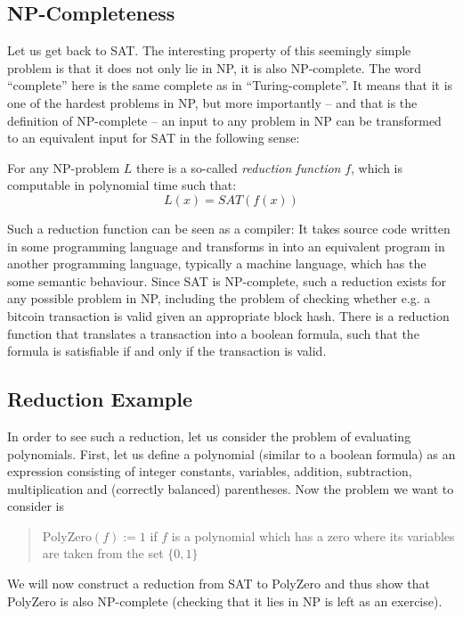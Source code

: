 \documentclass[11pt,letterpaper]{article}
\begin{document}
\subsection{NP-Completeness}

Let us get back to SAT. The interesting property of this seemingly simple problem is that it does not only lie in NP, it is also NP-complete. The word ``complete'' here is the same complete as in ``Turing-complete''. It means that it is one of the hardest problems in NP, but more importantly -- and that is the definition of NP-complete -- an input to any problem in NP can be transformed to an equivalent input for SAT in the following sense:


For any NP-problem $L$ there is a so-called \textit{reduction function} $f$, which is computable in polynomial time such that:
\[ L(x) = SAT(f(x)) \]

Such a reduction function can be seen as a compiler: It takes source code written in some programming language and transforms in into an equivalent program in another programming language, typically a machine language, which has the some semantic behaviour. Since SAT is NP-complete, such a reduction exists for any possible problem in NP, including the problem of checking whether e.g. a bitcoin transaction is valid given an appropriate block hash. There is a reduction function that translates a transaction into a boolean formula, such that the formula is satisfiable if and only if the transaction is valid.

\subsection{Reduction Example}

In order to see such a reduction, let us consider the problem of evaluating polynomials. First, let us define a polynomial (similar to a boolean formula) as an expression consisting of integer constants, variables, addition, subtraction, multiplication and (correctly balanced) parentheses. Now the problem we want to consider is
\begin{quote}
$\mathrm{PolyZero}(f) := 1$ if $f$ is a polynomial which has a zero where its variables are taken from the set $\{0, 1\}$
\end{quote}


We will now construct a reduction from SAT to PolyZero and thus show that PolyZero is also NP-complete (checking that it lies in NP is left as an exercise).
\end{document}

